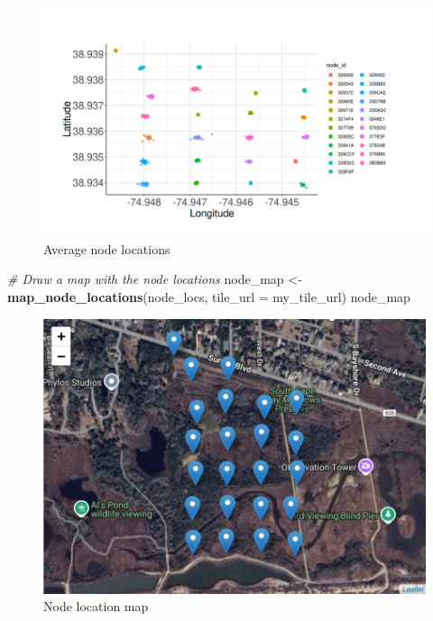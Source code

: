 \documentclass[
]{book}
\newenvironment{Shaded}{\begin{snugshade}}{\end{snugshade}}
\newcommand{\AttributeTok}[1]{\textcolor[rgb]{0.13,0.29,0.53}{#1}}
\newcommand{\CommentTok}[1]{\textcolor[rgb]{0.56,0.35,0.01}{\textit{#1}}}
\newcommand{\FunctionTok}[1]{\textcolor[rgb]{0.13,0.29,0.53}{\textbf{#1}}}
\newcommand{\NormalTok}[1]{#1}
\newcommand{\OtherTok}[1]{\textcolor[rgb]{0.56,0.35,0.01}{#1}}
\begin{document}
\begin{figure}
\centering
\includegraphics{images/habitat_use_node_loc_plot.png}
\caption{Average node locations}
\end{figure}

\begin{Shaded}
\begin{Highlighting}[]
\CommentTok{\# Draw a map with the node locations}
\NormalTok{node\_map }\OtherTok{\textless{}{-}} \FunctionTok{map\_node\_locations}\NormalTok{(node\_locs, }\AttributeTok{tile\_url =}\NormalTok{ my\_tile\_url)}
\NormalTok{node\_map}
\end{Highlighting}
\end{Shaded}

\begin{figure}
\centering
\includegraphics{images/habitat_use_node_map.png}
\caption{Node location map}
\end{figure}
\end{document}
